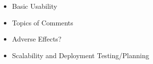 \begin{itemize}
    \item Basic Usability
    \item Topics of Comments
    \item Adverse Effects?
    \item Scalability and Deployment Testing/Planning
\end{itemize}